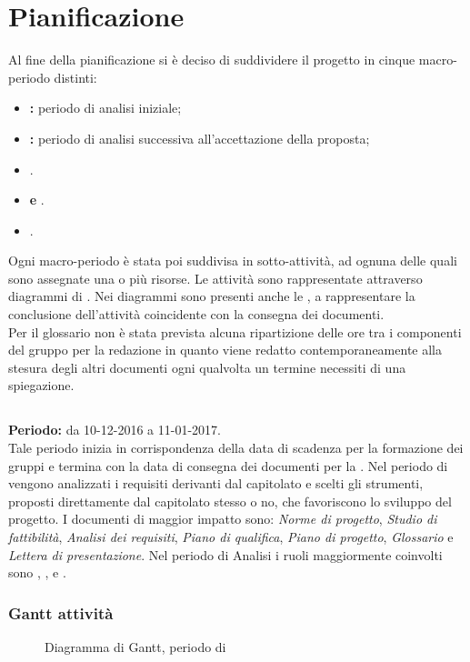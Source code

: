 \section{Pianificazione}

Al fine della pianificazione si è deciso di suddividere il progetto in cinque macro-periodo distinti:
\begin{itemize}
\item \textbf{\AR{}:} periodo di analisi iniziale;
\item \textbf{\AD{}:} periodo di analisi successiva all'accettazione della proposta;
\item \textbf{\PA{}}.
\item \textbf{\PD{} e \Cod{}}.
\item \textbf{\VV{}}.
\end{itemize}
Ogni macro-periodo è stata poi suddivisa in sotto-attività, ad ognuna delle quali sono assegnate una o più risorse. Le attività sono rappresentate attraverso diagrammi di . Nei diagrammi sono presenti anche le , a rappresentare la conclusione dell'attività coincidente con la consegna dei documenti. \\
Per il glossario non è stata prevista alcuna ripartizione delle ore tra i componenti del gruppo per la redazione in quanto viene redatto contemporaneamente alla stesura degli altri documenti ogni qualvolta un termine necessiti di una spiegazione.

\subsection{\AR{}}
\textbf{Periodo:} da 10-12-2016 a 11-01-2017. \\
Tale periodo inizia in corrispondenza della data di scadenza per la formazione dei gruppi e termina con la data di consegna dei documenti per la \RR{}. Nel periodo di \AR{} vengono analizzati i requisiti derivanti dal capitolato e scelti gli strumenti, proposti direttamente dal capitolato stesso o no, che favoriscono lo sviluppo del progetto. I documenti di maggior impatto sono: \textit{Norme di progetto}, \textit{Studio di fattibilità}, \textit{Analisi dei requisiti}, \textit{Piano di qualifica}, \textit{Piano di progetto}, \textit{Glossario} e \textit{Lettera di presentazione}.
Nel periodo di Analisi i ruoli maggiormente coinvolti sono \Analista{}, \Responsabile{}, \Amministratore{} e \Verificatore{}.

\subsubsection{Gantt attività}
\begin{figure}[H]
\centering
{}
\caption{Diagramma di Gantt, periodo di \AR{}}
\end{figure}

